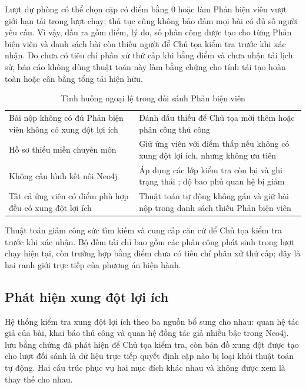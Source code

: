 Lượt dự phòng có thể chọn cặp có điểm bằng $0$ hoặc làm Phản biện viên vượt giới hạn tải trong lượt chạy; thủ tục cũng không bảo đảm mọi bài có đủ số người yêu cầu. Vì vậy, đầu ra gồm điểm, lý do, số phân công được tạo cho từng Phản biện viên và danh sách bài còn thiếu người để Chủ tọa kiểm tra trước khi xác nhận. Do chưa có tiêu chí phân xử thứ cấp khi bằng điểm và chưa nhận tải lịch sử, báo cáo không dùng thuật toán này làm bằng chứng cho tính tái tạo hoàn toàn hoặc cân bằng tổng tải hiện hữu.

\begin{table}[H]
  \centering
  \caption{Tình huống ngoại lệ trong đối sánh Phản biện viên}
  \label{tab:ch3-matching-exceptions-cut}
  \setlength{\tabcolsep}{3pt}
  \renewcommand{\arraystretch}{1.15}
  \begin{tabularx}{\textwidth}{|Y|Y|}
    \hline
     &  \\ \hline
    Bài nộp không có đủ Phản biện viên không có xung đột lợi ích & Đánh dấu thiếu để Chủ tọa mời thêm hoặc phân công thủ công \\ \hline
    Hồ sơ thiếu miền chuyên môn & Giữ ứng viên với điểm thấp nếu không có xung đột lợi ích, nhưng không ưu tiên \\ \hline
    Không cấu hình kết nối Neo4j & Áp dụng các lớp kiểm tra còn lại và ghi trạng thái ; độ bao phủ quan hệ bị giảm \\ \hline
    Tất cả ứng viên có điểm phù hợp đều có xung đột lợi ích & Thuật toán tự động không gán và giữ bài nộp trong danh sách thiếu Phản biện viên \\ \hline
  \end{tabularx}
\end{table}

Thuật toán giảm công sức tìm kiếm và cung cấp căn cứ để Chủ tọa kiểm tra trước khi xác nhận. Bộ đếm tải chỉ bao gồm các phân công phát sinh trong lượt chạy hiện tại, còn trường hợp bằng điểm chưa có tiêu chí phân xử thứ cấp; đây là hai ranh giới trực tiếp của phương án hiện hành.

\subsection{Phát hiện xung đột lợi ích}
\label{subsec:ch3-coi-cut}

Hệ thống kiểm tra xung đột lợi ích theo ba nguồn bổ sung cho nhau: quan hệ tác giả của bài, khai báo thủ công và quan hệ đồng tác giả nhiều bậc trong Neo4j.  lưu bằng chứng đã phát hiện để Chủ tọa kiểm tra, còn bản đồ xung đột được tạo cho lượt đối sánh là dữ liệu trực tiếp quyết định cặp nào bị loại khỏi thuật toán tự động. Hai cấu trúc phục vụ hai mục đích khác nhau và không được xem là thay thế cho nhau.

